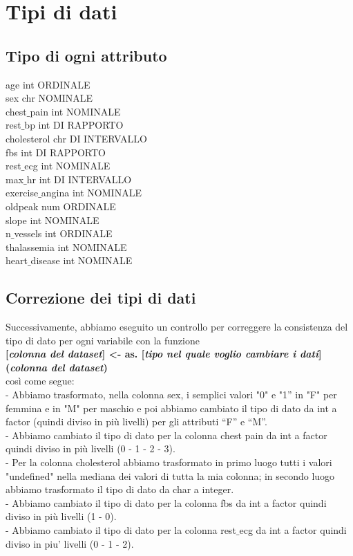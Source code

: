 \documentclass{article}
\begin{document}
\section { Tipi di dati }
\subsection { Tipo di ogni attributo }

age               int    ORDINALE\\
sex               chr    NOMINALE\\
chest$\_$pain        int    NOMINALE\\
rest$\_$bp           int    DI RAPPORTO\\
cholesterol       chr    DI INTERVALLO\\
fbs               int    DI RAPPORTO\\
rest$\_$ecg          int    NOMINALE\\
max$\_$hr            int    DI INTERVALLO\\
exercise$\_$angina   int    NOMINALE\\
oldpeak           num    ORDINALE\\
slope             int    NOMINALE\\
n$\_$vessels         int    ORDINALE\\
thalassemia       int    NOMINALE\\
heart$\_$disease     int    NOMINALE


\subsection { Correzione dei tipi di dati }
Successivamente, abbiamo eseguito un controllo per correggere la consistenza del tipo di dato per ogni variabile con la funzione 	\\	\textbf{[\textit{colonna del dataset}] \textless- as. [\textit{tipo nel quale voglio cambiare i dati}] (\textit{colonna del dataset})} \\così come segue:\\
-	Abbiamo trasformato, nella colonna sex, i semplici valori "0" e "1” in "F" per femmina e in "M" per maschio e poi abbiamo cambiato il tipo di dato da int a factor (quindi diviso in più livelli) per gli attributi “F” e “M”.\\
-	Abbiamo cambiato il tipo di dato per la colonna chest pain da int a factor quindi diviso in più livelli (0 - 1 - 2 - 3).\\
-	Per la colonna cholesterol abbiamo trasformato in primo luogo tutti i valori "undefined" nella mediana dei valori di tutta la mia colonna;  in secondo luogo abbiamo trasformato il tipo di dato da char a integer.\\
-	Abbiamo cambiato il tipo di dato per la colonna fbs da int a factor quindi diviso in più livelli (1 - 0).\\
-	Abbiamo cambiato il tipo di dato per la colonna rest$\_$ecg da int a factor quindi diviso in piu' livelli (0 - 1 - 2).\\
\end{document}
